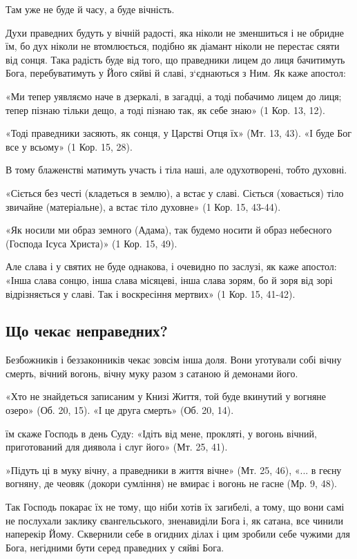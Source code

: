 \documentclass[main.tex]{subfiles}
\begin{document}
Там уже не буде й часу, а буде вічність.

Духи праведних будуть у вічній радості, яка ніколи не зменшиться і не обридне їм, бо дух ніколи не втомлюється, подібно як діамант ніколи не перестає сяяти від сонця. Така радість буде від того, що праведники лицем до лиця бачитимуть Бога, перебуватимуть у Його сяйві й славі, з`єднаються з Ним. Як каже апостол:

«Ми тепер уявляємо наче в дзеркалі, в загадці, а тоді побачимо лицем до лиця; тепер пізнаю тільки дещо, а тоді пізнаю так, як себе знаю» (1 Кор. 13, 12).

«Тоді праведники засяють, як сонця, у Царстві Отця їх» (Мт. 13, 43). «І буде Бог все у всьому» (1 Кор. 15, 28).

В тому блаженстві матимуть участь і тіла наші, але одухотворені, тобто духовні.
 
«Сіється без честі (кладеться в землю), а встає у славі. Сіється (ховається) тіло звичайне (матеріальне), а встає тіло духовне» (1 Кор. 15, 43-44).

«Як носили ми образ земного (Адама), так будемо носити й образ небесного (Господа Ісуса Христа)» (1 Кор. 15, 49).

Але слава і у святих не буде однакова, і очевидно по заслузі, як каже апостол: «Інша слава сонцю, інша слава місяцеві, інша слава зорям, бо й зоря від зорі відрізняється у славі. Так і воскресіння мертвих» (1 Кор. 15, 41-42).

\subsection{Що чекає неправедних?}

Безбожників і беззаконників чекає зовсім інша доля. Вони уготували собі вічну смерть, вічний вогонь, вічну муку разом з сатаною й демонами його.

«Хто не знайдеться записаним у Книзі Життя, той буде вкинутий у вогняне озеро» (Об. 20, 15). «І це друга смерть» (Об. 20, 14).

їм скаже Господь в день Суду: «Ідіть від мене, прокляті, у вогонь вічний, приготований для диявола і слуг його» (Мт. 25, 41).

»Підуть ці в муку вічну, а праведники в життя вічне» (Мт. 25, 46), «... в геєну вогняну, де чеовяк (докори сумління) не вмирає і вогонь не гасне (Мр. 9, 48).

Так Господь покарає їх не тому, що ніби хотів їх загибелі, а тому, що вони самі не послухали заклику євангельського, зненавиділи Бога і, як сатана, все чинили наперекір Йому. Сквернили себе в огидних ділах і цим зробили себе чужими для Бога, негідними бути серед праведних у сяйві Бога.
\end{document}
